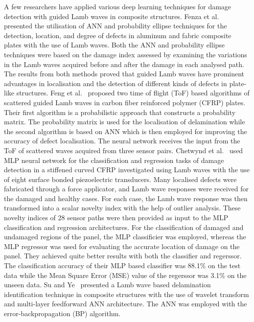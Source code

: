 A few researchers have applied various deep learning techniques for damage detection with guided Lamb waves in composite structures. 
Fenza et al.~\cite{de2015application} presented the utilisation of ANN and probability ellipse techniques for the detection, location, and degree of defects in aluminum and fabric composite plates with the use of Lamb waves. 
Both the ANN and probability ellipse techniques were based on the damage index assessed by examining the variations in the Lamb waves acquired before and after the damage in each analysed path. 
The results from both methods proved that guided Lamb waves have prominent advantages in localisation and the detection of different kinds of defects in plate-like structures. 
Feng et al.~\cite{feng2019locating} proposed two time of flight (ToF) based algorithms of scattered guided Lamb waves in carbon fiber reinforced polymer (CFRP) plates. 
Their first algorithm is a probabilistic approach that constructs a probability matrix. The probability matrix is used for the localisation of delamination while the second algorithm is based on ANN which is then employed for improving the accuracy of defect localisation. 
The neural network receives the input from the ToF of scattered waves acquired from three sensor pairs.
Chetwynd et al.~\cite{chetwynd2008damage} used MLP neural network for the classification and regression tasks of damage detection in a stiffened curved CFRP investigated using Lamb waves with the use of eight surface bonded piezoelectric transducers. 
Many localised defects were fabricated through a force applicator, and Lamb wave responses were received for the damaged and healthy cases. 
For each case, the Lamb wave response was then transformed into a scalar novelty index with the help of outlier analysis. 
These novelty indices of 28 sensor paths were then provided as input to the MLP classification and regression architectures. 
For the classification of damaged and undamaged regions of the panel, the MLP classificier was employed, whereas the MLP regressor was used for evaluating the accurate location of damage on the panel. 
They achieved quite better results with both the classifier and regerssor. 
The classification accuracy of their MLP based classifier was 88.1\% on the test data while the Mean Square Error (MSE) value of the regerssor was 3.1\% on the unseen data. Su and Ye~\cite{su2004lamb} presented a Lamb wave based delamination identification technique in composite structures with the use of wavelet transform and multi-layer feedforward ANN architecture. 
The ANN was employed with the error-backpropagation (BP) algorithm. 
